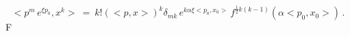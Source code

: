 \begin{equation} < p^m\,e^{\xi p_0} , x^k
> \ = \ k! (< p , x >)^k \delta_{m k }\,e^{k \alpha \xi <p_0 ,
x_0>}\, f^{\frac{1}{2} k(k-1)}(\alpha <p_0 , x_0>)\,
.\label{425}\end{equation}F
